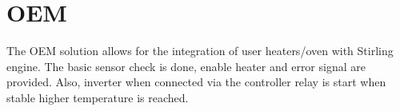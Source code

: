 \section{OEM}
\label{ch:oem}

The OEM solution allows for the integration of user heaters/oven with Stirling engine. The basic sensor check is done, enable heater and error signal are provided. Also, inverter when connected via the controller relay is start when stable higher temperature is reached.

\begin{figure}[h]		
	
	\vspace*{5.0in}
	\label{fig:OEMFlowchart}	
\end{figure}
